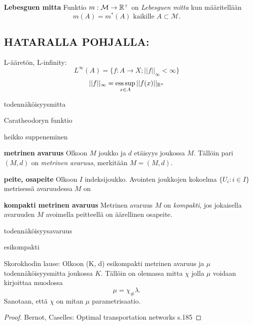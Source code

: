 \begin{definition}
    \textbf{Lebesguen mitta} Funktio $m : \mathcal M \to \mathbb{R}^+$ on \textit{Lebesguen mitta} kun määritellään
    $$m(A) = m^*(A) \text{ kaikille } A\subset \mathcal M.$$
\end{definition}

\subsection{HATARALLA POHJALLA:}
\begin{definition}
L-ääretön, L-infinity:
    \[L^\infty (A) = \{f:A\to X ;  ||f||_\infty < \infty\}\] 
    \[||f||_\infty = \operatorname*{ess\, sup}_{x\in A} ||f(x)||_{\mathbb{R}^n}\]
\end{definition}



\begin{definition}
    todennäköisyysmitta
\end{definition}


\begin{definition}
    Caratheodoryn funktio
\end{definition}





\begin{definition}
    heikko suppeneminen
\end{definition}


\begin{definition}
    \textbf{metrinen avaruus} Olkoon $M$ joukko ja $d$ etäisyys joukossa $M$. Tällöin pari $(M, d)$ on \textit{metrinen avaruus}, merkitään $M = (M, d)$.
\end{definition}

\begin{definition}
    \textbf{peite, osapeite} Olkoon $I$ indeksijoukko. Avointen joukkojen kokoelma $\{U_i \colon i \in I\}$ metrisessä avaruudessa $M$ on 
\end{definition}

\begin{definition}
    \textbf{kompakti metrinen avaruus} Metrinen avaruus $M$ on \textit{kompakti}, jos jokaisella avaruuden $M$ avoimella peitteellä on äärellinen osapeite.
\end{definition}
\begin{definition}
    todennäköisyysavaruus
\end{definition}


\begin{definition}
    esikompakti
\end{definition}

\begin{theorem}
    Skorokhodin lause: Olkoon (K, d) esikompakti metrinen avaruus ja $\mu$ todennäköisyysmitta joukossa $K$. Tällöin on olemassa mitta $\chi$ jolla  $\mu$ voidaan kirjoittaa muodossa
    $$ \mu = \chi_\# \lambda. $$
    Sanotaan, että $\chi$ on mitan $\mu$ parametrisaatio.
\end{theorem}
\begin{proof}
Bernot, Caselles: Optimal transportation networks s.185
\end{proof}

